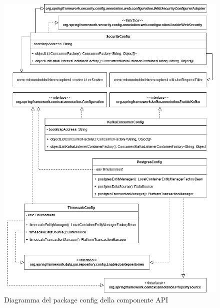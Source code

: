 		\begin{figure}[H]
			\centering
			\includegraphics[scale=0.550]{res/images/API/ConfigPackage.png}
			\caption{Diagramma del package config della componente API}
			\label{Diagramma 12}
		\end{figure}
